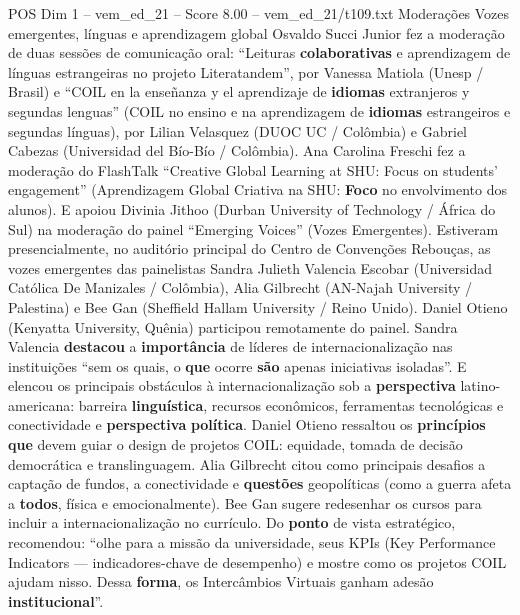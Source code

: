 \begin{textsample}{POS Dim 1 – vem\_ed\_21 – Score 8.00 – vem\_ed\_21/t109.txt}  \label{ex:f1_pos_166}
Moderações Vozes emergentes, línguas e aprendizagem global Osvaldo Succi Junior fez a moderação de duas sessões de comunicação oral: “Leituras \textbf{colaborativas} e aprendizagem de línguas estrangeiras no projeto Literatandem”, por Vanessa Matiola (Unesp / Brasil) e “COIL en la enseñanza y el aprendizaje de \textbf{idiomas} extranjeros y segundas lenguas” (COIL no ensino e na aprendizagem de \textbf{idiomas} estrangeiros e segundas línguas), por Lilian Velasquez (DUOC UC / Colômbia) e Gabriel Cabezas (Universidad del Bío-Bío / Colômbia).
Ana Carolina Freschi fez a moderação do FlashTalk “Creative Global Learning at SHU: Focus on students’ engagement” (Aprendizagem Global Criativa na SHU: \textbf{Foco} no envolvimento dos alunos).
E apoiou Divinia Jithoo (Durban University of Technology / África do Sul) na moderação do painel “Emerging Voices” (Vozes Emergentes).
Estiveram presencialmente, no auditório principal do Centro de Convenções Rebouças, as vozes emergentes das painelistas Sandra Julieth Valencia Escobar (Universidad Católica De Manizales / Colômbia), Alia Gilbrecht (AN-Najah University / Palestina) e Bee Gan (Sheffield Hallam University / Reino Unido).
Daniel Otieno (Kenyatta University, Quênia) participou remotamente do painel.
Sandra Valencia \textbf{destacou} a \textbf{importância} de líderes de internacionalização nas instituições “sem os quais, o \textbf{que} ocorre \textbf{são} apenas iniciativas isoladas”.
E elencou os principais obstáculos à internacionalização sob a \textbf{perspectiva} latino-americana: barreira \textbf{linguística}, recursos econômicos, ferramentas tecnológicas e conectividade e \textbf{perspectiva} \textbf{política}.
Daniel Otieno ressaltou os \textbf{princípios} \textbf{que} devem guiar o design de projetos COIL: equidade, tomada de decisão democrática e translinguagem.
Alia Gilbrecht citou como principais desafios a captação de fundos, a conectividade e \textbf{questões} geopolíticas (como a guerra afeta a \textbf{todos}, física e emocionalmente).
Bee Gan sugere redesenhar os cursos para incluir a internacionalização no currículo.
Do \textbf{ponto} de vista estratégico, recomendou: “olhe para a missão da universidade, seus KPIs (Key Performance Indicators — indicadores-chave de desempenho) e mostre como os projetos COIL ajudam nisso.
Dessa \textbf{forma}, os Intercâmbios Virtuais ganham adesão \textbf{institucional}”.

\end{textsample}
